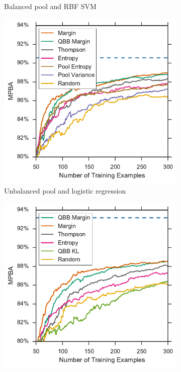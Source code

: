 \begin{figure}[p]
\begin{subfigure}{.5\textwidth}
		\caption{Balanced pool and RBF SVM}
		\label{fig:sdss_br_ind_upper}
	\end{subfigure}
	\begin{subfigure}{.5\textwidth}
		\centering
		\includegraphics[width=\textwidth]{figures/5_active/sdss_ul_ind_upper}
		\caption{Unbalanced pool and logistic regression}
		\label{fig:sdss_ul_ind_upper}
	\end{subfigure}%
	\begin{subfigure}{.5\textwidth}
		\centering
		\includegraphics[width=\linewidth]{figures/5_active/sdss_ur_ind_upper}

\end{subfigure}
\end{figure}
